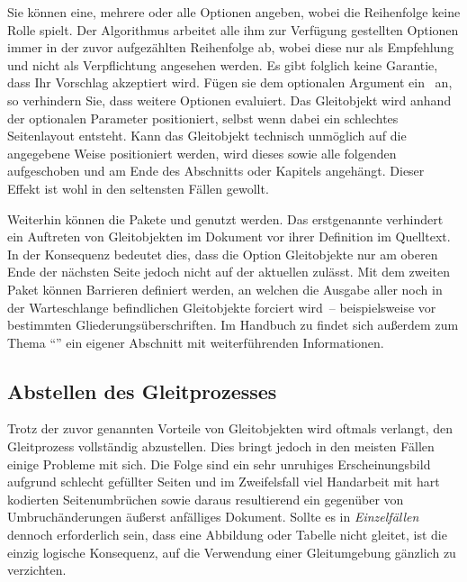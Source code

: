 \documentclass[%
  english,ngerman,%
  cdgeometry=no,DIV=12,%
  cd=false,cdfont=false,cdtitle=true,%
  headings=normal,%
  automark,%
  listof=toc,%
]{tudscrartcl}
\begin{document}
Sie können eine, mehrere oder alle Optionen angeben, wobei die Reihenfolge 
keine Rolle spielt. Der Algorithmus arbeitet alle ihm zur Verfügung gestellten 
Optionen immer in der zuvor aufgezählten Reihenfolge ab, wobei diese nur als 
Empfehlung und nicht als Verpflichtung angesehen werden. Es gibt folglich keine 
Garantie, dass Ihr Vorschlag akzeptiert wird. Fügen sie dem optionalen Argument 
ein~\PValue{!} an, so verhindern Sie, dass  weitere Optionen 
evaluiert. Das Gleitobjekt wird anhand der optionalen Parameter positioniert, 
selbst wenn dabei ein schlechtes Seitenlayout entsteht. Kann das Gleitobjekt 
technisch unmöglich auf die angegebene Weise positioniert werden, wird dieses 
sowie alle folgenden aufgeschoben und am Ende des Abschnitts oder Kapitels 
angehängt. Dieser Effekt ist wohl in den seltensten Fällen gewollt. 

Weiterhin können die Pakete  und  genutzt 
werden. Das erstgenannte verhindert ein Auftreten von Gleitobjekten im Dokument 
vor ihrer Definition im Quelltext. In der Konsequenz bedeutet dies, dass die 
Option  Gleitobjekte nur am oberen Ende der nächsten Seite 
jedoch nicht auf der aktuellen zulässt. Mit dem zweiten Paket können Barrieren 
definiert werden, an welchen die Ausgabe aller noch in der Warteschlange 
befindlichen Gleitobjekte forciert wird~-- beispielsweise vor bestimmten 
Gliederungsüberschriften. Im Handbuch zu \TUDScript findet sich außerdem zum 
Thema \enquote{} 
ein eigener Abschnitt mit weiterführenden Informationen.



\subsection{Abstellen des Gleitprozesses}

Trotz der zuvor genannten Vorteile von Gleitobjekten wird oftmals verlangt, den 
Gleitprozess vollständig abzustellen. Dies bringt jedoch in den meisten Fällen 
einige Probleme mit sich. Die Folge sind ein sehr unruhiges Erscheinungsbild 
aufgrund schlecht gefüllter Seiten und im Zweifelsfall viel Handarbeit mit hart 
kodierten Seitenumbrüchen sowie daraus resultierend ein gegenüber von 
Umbruchänderungen äußerst anfälliges Dokument. Sollte es in \emph{Einzelfällen} 
dennoch erforderlich sein, dass eine Abbildung oder Tabelle nicht gleitet, ist 
die einzig logische Konsequenz, auf die Verwendung einer Gleitumgebung gänzlich 
zu verzichten. 
\end{document}
